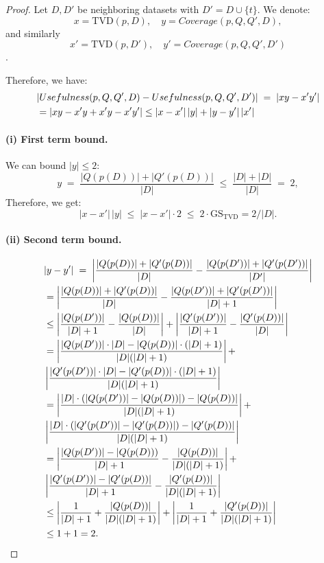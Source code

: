 \begin{proof}
Let $D, D'$ be neighboring datasets with $D' = D \cup \{t\}$.
We denote:
\[
x = \mathrm{TVD}(p,D), \quad
y = Coverage(p,Q,Q',D),
\]
and similarly 
\[
x' = \mathrm{TVD}(p,D'), \quad
y' = Coverage(p,Q,Q',D')
\].

Therefore, we have:
\begin{align}
&|Usefulness(p,Q,Q',D) - Usefulness(p,Q,Q',D')| \;=\; |x y - x' y'| 
\notag \\
&= |xy - x'y + x'y - x'y'|
   \leq |x - x'|\,|y|
   + |y - y'|\,|x'| \label{eq:useful-diff-ineq}
\end{align}

\paragraph{(i) First term bound.}
We can bound \(|y| \leq 2\):
\[
y \;=\; \frac{|Q(p(D))| + |Q'(p(D))|}{|D|} \; \leq \; \frac{|D| + |D|}{|D|} \;=\; 2,
\]
Therefore, we get:
\begin{equation}
|x - x'|\,|y|\;\leq\; |x - x'| \cdot 2
\;\leq\; 2 \cdot \mathrm{GS}_{\mathrm{TVD}} = 2/|D|.
\label{eq:term1-bound}
\end{equation}

\paragraph{(ii) Second term bound.}
\begin{align}
&|y - y'| \;=\;
\left| \frac{|Q(p(D))| + |Q'(p(D))|}{|D|}
     - \frac{|Q(p(D'))| + |Q'(p(D'))|}{|D'|} \right| \notag \\
&= \left| \frac{|Q(p(D))| + |Q'(p(D))|}{|D|}
     - \frac{|Q(p(D'))| + |Q'(p(D'))|}{|D|+1} \right| \notag \\
&\leq \left| \frac{|Q(p(D'))|}{|D|+1} - \frac{|Q(p(D))|}{|D|} \right| + \left| \frac{|Q'(p(D'))|}{|D|+1} - \frac{|Q'(p(D))|}{|D|} \right| \notag \\
&= \left| \frac{|Q(p(D'))|\cdot |D|- |Q(p(D))| \cdot (|D|+1)}{|D|(|D|+1)} \right| + \notag\\
&\left| \frac{|Q'(p(D'))|\cdot |D| - |Q'(p(D))|\cdot (|D|+1)}{|D|(|D|+1)} \right| \notag \\
&= \left| \frac{|D|\cdot (|Q(p(D'))|- |Q(p(D))|) -|Q(p(D))|}{|D|(|D|+1)} \right| + \notag\\
&\left| \frac{|D|\cdot (|Q'(p(D'))| - |Q'(p(D))|) - |Q'(p(D))|}{|D|(|D|+1)} \right| \notag \\
&= \left| \frac{|Q(p(D'))|- |Q(p(D)))}{|D| + 1} - \frac{|Q(p(D))|}{|D|(|D|+1)} \right| + \notag\\
&\left| \frac{|Q'(p(D'))| - |Q'(p(D))|}{|D| + 1} - \frac{|Q'(p(D))|}{|D|(|D|+1)} \right| \notag \\
&\leq \left| \frac{1}{|D| + 1} + \frac{|Q(p(D))|}{|D|(|D|+1)} \right| + \left| \frac{1}{|D| + 1} + \frac{|Q'(p(D))|}{|D|(|D|+1)} \right| \notag \\
&\leq 1+1 =2.
\end{align}


\end{proof}
